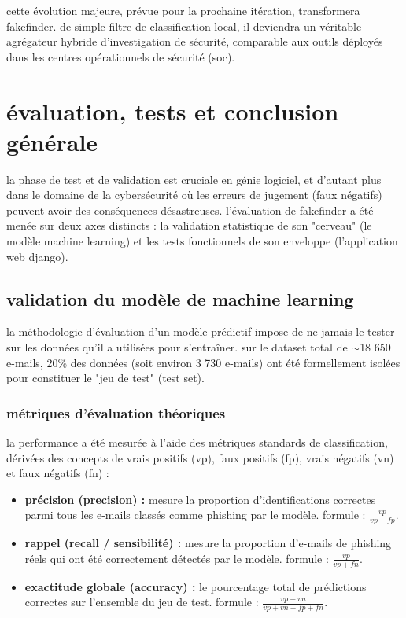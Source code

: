 \documentclass[12pt,a4paper]{report}
\begin{document}
cette évolution majeure, prévue pour la prochaine itération, transformera fakefinder. de simple filtre de classification local, il deviendra un véritable agrégateur hybride d'investigation de sécurité, comparable aux outils déployés dans les centres opérationnels de sécurité (soc).


\chapter{évaluation, tests et conclusion générale}

la phase de test et de validation est cruciale en génie logiciel, et d'autant plus dans le domaine de la cybersécurité où les erreurs de jugement (faux négatifs) peuvent avoir des conséquences désastreuses. l'évaluation de fakefinder a été menée sur deux axes distincts : la validation statistique de son "cerveau" (le modèle machine learning) et les tests fonctionnels de son enveloppe (l'application web django).

\section{validation du modèle de machine learning}
la méthodologie d'évaluation d'un modèle prédictif impose de ne jamais le tester sur les données qu'il a utilisées pour s'entraîner. sur le dataset total de $\sim$18 650 e-mails, 20\% des données (soit environ 3 730 e-mails) ont été formellement isolées pour constituer le "jeu de test" (test set).

\subsection{métriques d'évaluation théoriques}
la performance a été mesurée à l'aide des métriques standards de classification, dérivées des concepts de vrais positifs (vp), faux positifs (fp), vrais négatifs (vn) et faux négatifs (fn) :
\begin{itemize}
    \item \textbf{précision (precision) :} mesure la proportion d'identifications correctes parmi tous les e-mails classés comme phishing par le modèle. formule : $\frac{vp}{vp + fp}$.
    \item \textbf{rappel (recall / sensibilité) :} mesure la proportion d'e-mails de phishing réels qui ont été correctement détectés par le modèle. formule : $\frac{vp}{vp + fn}$.
    \item \textbf{exactitude globale (accuracy) :} le pourcentage total de prédictions correctes sur l'ensemble du jeu de test. formule : $\frac{vp + vn}{vp + vn + fp + fn}$.
\end{itemize}
\end{document}
